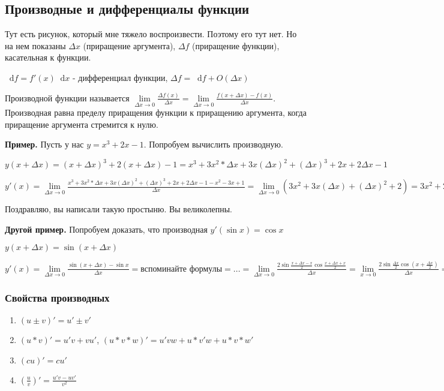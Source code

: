 \documentclass{article}
\newcommand*\diff{\mathop{}\!\mathrm{d}}
\begin{document}
\begin{flushleft}
\subsection{Производные и дифференциалы функции}

Тут есть рисунок, который мне тяжело воспроизвести. Поэтому его тут нет. Но на нем показаны $\Delta x$ (приращение аргумента), $\Delta f$ (приращение функции), касательная к функции.

$\diff f = f' (x) \diff x$ - дифференциал функции, $\Delta f = \diff f + O(\Delta x)$

\hfill

Производной функции называется $\lim\limits_{\Delta x \to 0} \frac{\Delta f(x)}{\Delta x} = \lim\limits_{\Delta x \to 0} \frac{f(x + \Delta x) - f(x)}{\Delta x}$. Производная равна пределу приращения функции к приращению аргумента, когда приращение аргумента стремится к нулю.

\hfill

\textbf{Пример.} Пусть у нас $y = x^3 + 2x - 1$. Попробуем вычислить производную.

$y(x + \Delta x) = (x + \Delta x)^3 + 2(x + \Delta x) - 1 = x^3 + 3x^2 * \Delta x + 3x(\Delta x)^2 + (\Delta x)^3 + 2x + 2\Delta x - 1$

$y'(x) = \lim\limits_{\Delta x \to 0} \frac{x^3 + 3x^2 * \Delta x + 3x (\Delta x)^2 + (\Delta x)^3 + 2x + 2\Delta x - 1 - x^2 - 3x + 1}{\Delta x} = \lim\limits_{\Delta x \to 0} (3x^2 + 3x(\Delta x) + (\Delta x)^2 + 2) = 3x^2 + 2$

Поздравляю, вы написали такую простыню. Вы великолепны.

\hfill

\textbf{Другой пример.} Попробуем доказать, что производная $y'(\sin x) = \cos x$

$y(x + \Delta x) = \sin(x + \Delta x)$

$y'(x) = \lim\limits_{\Delta x \to 0} \frac{\sin(x + \Delta x) - \sin x}{\Delta x} = \text{вспоминайте формулы} = ... = \lim\limits_{\Delta x \to 0} \frac{2 \sin \frac{x + \Delta x - x}{2} \cos \frac{x + \Delta x + x}{2}}{\Delta x} = \lim\limits_{x \to 0} \frac{2 \sin \frac{\Delta x}{2} \cos (x + \frac{\Delta x}{2})}{\Delta x} = \lim\limits_{x \to 0} \frac{2 \cos x}{2} = \cos x$

\subsubsection{Свойства производных}

\begin{enumerate}
    \item $(u \pm v)' = u' \pm v'$
    \item $(u * v)' = u' v + v u'$, $(u * v * w)' = u' v w + u * v' w + u * v * w'$
    \item $(cu)' = c u'$
    \item $(\frac{u}{v})' = \frac{u' v - u v'}{v^2}$
\end{enumerate}


\end{flushleft}
\end{document}
